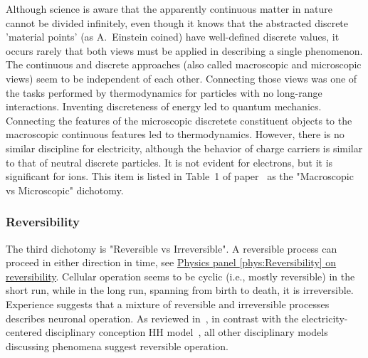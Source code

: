 {


Although science is aware that the apparently continuous matter in nature cannot be divided infinitely, even though it knows that the abstracted discrete
'material points' (as A.~Einstein coined) have well-defined discrete values,
it occurs rarely that both views must be applied in describing a single
phenomenon. The continuous and discrete approaches (also called macroscopic and microscopic views) seem to be independent of each other.
Connecting those views was one of the tasks performed by thermodynamics for particles with no long-range interactions. Inventing discreteness of energy led to quantum mechanics.
Connecting the features of the microscopic discretete constituent objects  
to the macroscopic continuous features led to thermodynamics.
However, there is no similar discipline for electricity,
although the behavior of charge carriers is similar to that of neutral discrete 
particles. It is not evident for electrons, but it is significant for ions.
This item is listed in Table~1 of paper~\cite{ThermodynamicAPDrukarch:2022}
as the "Macroscopic vs Microscopic" dichotomy.
}

\subsubsection{Reversibility\label{sec:Physics-Reversibility}}
The third dichotomy is "Reversible vs Irreversible".
A reversible process can proceed in either direction in time, see \hyperlink{phys:Reversibility}{Physics panel \ref{phys:Reversibility} on reversibility}.
Cellular operation seems to be cyclic (i.e., mostly reversible)
in the short run, while in the long run, spanning from birth to death, 
it is irreversible. 
Experience suggests that a mixture of reversible
and irreversible processes describes neuronal operation. 
As reviewed in~\cite{ThermodynamicAPDrukarch:2022}, in contrast with the electricity-centered disciplinary
conception \gls{HH} model~\cite{HodgkinHuxley:1952}, all other disciplinary models discussing phenomena suggest reversible operation.

